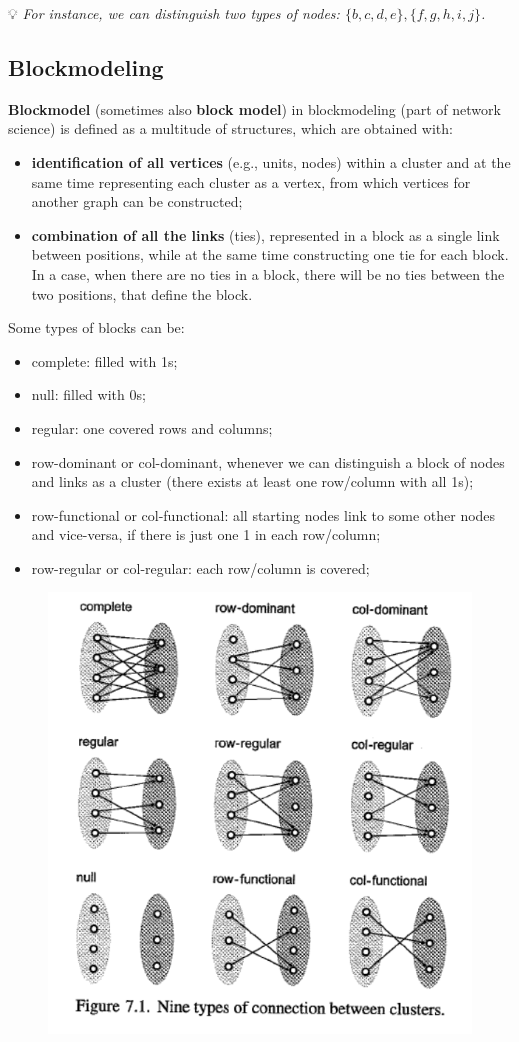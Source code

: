 \documentclass[
  notitlepage,
  onecolumn,
  openany]{book}
\providecommand{\tightlist}{%
  \setlength{\itemsep}{0pt}\setlength{\parskip}{0pt}}
\begin{document}
💡 \emph{For instance, we can distinguish two types of nodes: \(\{b,c,d,e\}, \{f,g,h,i,j\}\).}

\hypertarget{blockmodeling}{%
\subsection{Blockmodeling}\label{blockmodeling}}

\textbf{Blockmodel} (sometimes also \textbf{block model}) in blockmodeling (part of network science) is defined as a multitude of structures, which are obtained with:

\begin{itemize}
\tightlist
\item
  \textbf{identification of all vertices} (e.g., units, nodes) within a cluster and at the same time representing each cluster as a vertex, from which vertices for another graph can be constructed;
\item
  \textbf{combination of all the links} (ties), represented in a block as a single link between positions, while at the same time constructing one tie for each block. In a case, when there are no ties in a block, there will be no ties between the two positions, that define the block.
\end{itemize}

Some types of blocks can be:

\begin{itemize}
\tightlist
\item
  complete: filled with 1s;
\item
  null: filled with 0s;
\item
  regular: one covered rows and columns;
\item
  row-dominant or col-dominant, whenever we can distinguish a block of nodes and links as a cluster (there exists at least one row/column with all 1s);
\item
  row-functional or col-functional: all starting nodes link to some other nodes and vice-versa, if there is just one 1 in each row/column;
\item
  row-regular or col-regular: each row/column is covered;
\end{itemize}

\begin{figure}[h!]

{\centering \includegraphics[width=0.5\linewidth]{images/11-Subgroups and Structural Equivalence/Untitled 5} 

}

\end{figure}
\end{document}
